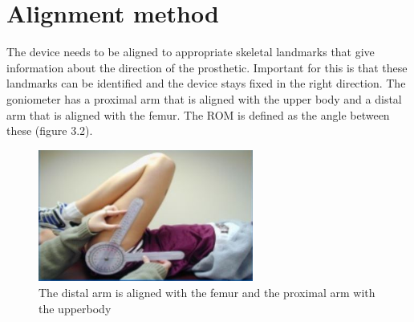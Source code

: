 \documentclass[whitelogo]{tudelft-report}
\begin{document}
{{{\section{Alignment method}
The device needs to be aligned to appropriate skeletal landmarks that give information about the direction of the prosthetic. Important for this is that these landmarks can be identified and the device stays fixed in the right direction. The goniometer has a proximal arm that is aligned with the upper body and a distal arm that is aligned with the femur. The ROM is defined as the angle between these (figure 3.2). 
\begin{figure}[!htb]
	\centering\includegraphics[width=200pt]{goniometer_measurement2.JPG}
	\caption{The distal arm is aligned with the femur and the proximal arm with the upperbody\cite{goniometer_measurement}}
\end{figure}

}}}
\end{document}
